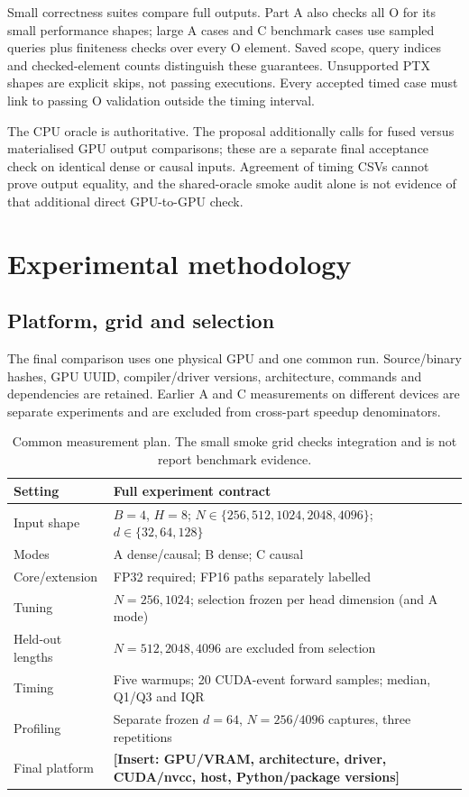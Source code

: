 \documentclass[11pt,a4paper]{article}
\newcommand{\pending}[1]{\textcolor{draftblue}{\textbf{[Insert: #1]}}}
\begin{document}
Small correctness suites compare full outputs. Part A also checks all O for its
small performance shapes; large A cases and C benchmark cases use sampled
queries plus finiteness checks over every O element. Saved scope, query indices
and checked-element counts distinguish these guarantees. Unsupported PTX
shapes are explicit skips, not passing executions. Every accepted timed case
must link to passing O validation outside the timing interval.

The CPU oracle is authoritative. The proposal additionally calls for fused
versus materialised GPU output comparisons; these are a separate final acceptance
check on identical dense or causal inputs. Agreement of timing CSVs cannot prove
output equality, and the shared-oracle smoke audit alone is not evidence of
that additional direct GPU-to-GPU check.

\section{Experimental methodology}\label{sec:method}
\subsection{Platform, grid and selection}
The final comparison uses one physical GPU and one common run. Source/binary
hashes, GPU UUID, compiler/driver versions, architecture, commands and dependencies
are retained. Earlier A and C measurements on different devices are separate
experiments and are excluded from cross-part speedup denominators.

\begin{table}[tbp]\centering\small
\begin{tabularx}{\linewidth}{@{}lY@{}}\toprule
Setting & Full experiment contract\\\midrule
Input shape & $B=4$, $H=8$; $N\in\{256,512,1024,2048,4096\}$; $d\in\{32,64,128\}$\\
Modes & A dense/causal; B dense; C causal\\
Core/extension & FP32 required; FP16 paths separately labelled\\
Tuning & $N=256,1024$; selection frozen per head dimension (and A mode)\\
Held-out lengths & $N=512,2048,4096$ are excluded from selection\\
Timing & Five warmups; 20 CUDA-event forward samples; median, Q1/Q3 and IQR\\
Profiling & Separate frozen $d=64$, $N=256/4096$ captures, three repetitions\\
Final platform & \pending{GPU/VRAM, architecture, driver, CUDA/nvcc, host, Python/package versions}\\
\bottomrule\end{tabularx}
\caption{Common measurement plan. The small smoke grid checks integration and is not report benchmark evidence.}\label{tab:grid}
\end{table}
\end{document}
